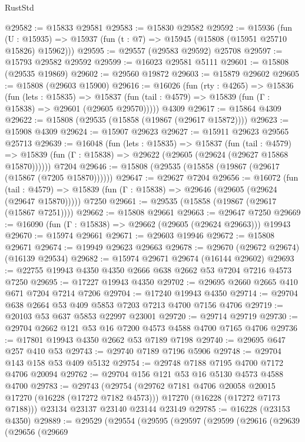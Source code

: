 \begin{lexlean}{RustStd}
\begin{coremodule}
@29582 := @15833 @29581
@29583 := @15830 @29582
@29592 := @15936
    (fun (U : @15935) => @15937 (fun (t : @7) => @15945 (@15808 (@15951 @25710 @15826) @15962)))
@29595 := @29557 (@29583 @29592) @25708
@29597 := @15793 @29582 @29592
@29599 := @16023 @29581 @5111
@29601 := @15808 (@29535 @19869)
@29602 := @29560 @19872
@29603 := @15879 @29602
@29605 := @15808 (@29603 @15900)
@29616 := @16026
    (fun (rty : @4265) =>
    @15836
      (fun (lets : @15835) =>
      @15837 (fun (tail : @4579) => @15839 (fun (Γ : @15838) => @29601 (@29605 @29570)))))
    @4309
@29617 := @15864 @4309
@29622 := @15808 (@29535 (@15858 (@19867 (@29617 @15872))))
@29623 := @15908 @4309
@29624 := @15907 @29623
@29627 := @15911 @29623 @29565 @25713
@29639 := @16048
    (fun (lets : @15835) =>
    @15837
      (fun (tail : @4579) =>
      @15839 (fun (Γ : @15838) => @29622 (@29605 (@29624 (@29627 @15868 @15870))))))
    @7204
@29646 := @15808 (@29535 (@15858 (@19867 (@29617 (@15867 (@7205 @15870))))))
@29647 := @29627 @7204
@29656 := @16072
    (fun (tail : @4579) => @15839 (fun (Γ : @15838) => @29646 (@29605 (@29624 (@29647 @15870)))))
    @7250
@29661 := @29535 (@15858 (@19867 (@29617 (@15867 @7251))))
@29662 := @15808 @29661
@29663 := @29647 @7250
@29669 := @16090 (fun (Γ : @15838) => @29662 (@29605 (@29624 @29663))) @19943
@29670 := @15974 @29661
@29671 := @29603 @19946
@29672 := @15808 @29671
@29674 := @19949 @29623 @29663
@29678 := @29670 (@29672 @29674) (@16139 @29534)
@29682 := @15974 @29671 @29674 (@16144 @29602)
@29693 := @22755 @19943 @4350 @4350 @2666 @638 @2662 @53 @7204 @7216 @4573 @7250
@29695 := @17227 @19943 @4350
@29702 := @29695 @2660 @2665 @410 @671 @7204 @7214 @7206
@29704 := @17240 @19943 @4350
@29714 := @29704 @638 @2664 @53 @409 @5853 @7203 @7213 @4700 @7156 @4706
@29719 := @20103 @53 @637 @5853 @22997 @23001
@29720 := @29714 @29719
@29730 := @29704 @2662 @121 @53 @16 @7200 @4573 @4588 @4700 @7165 @4706
@29736 := @17801 @19943 @4350 @2662 @53 @7189 @7198
@29740 := @29695 @647 @257 @410 @53
@29743 := @29740 @7189 @7196 @5906
@29748 := @29704 @143 @158 @53 @409 @5132
@29754 := @29748 @7188 @7195 @4700 @7172 @4706 @20094
@29762 := @29704 @156 @121 @53 @16 @5130 @4573 @4588 @4700
@29783 := @29743
    (@29754
      (@29762 @7181 @4706 @20058 @20015 @17270 (@16228 (@17272 @7182 @4573)))
      @17270
      (@16228 (@17272 @7173 @7188)))
    @23134
    @23137
    @23140
    @23144
    @23149
@29785 := @16228 (@23153 @4350)
@29889 := @29529
    (@29554
      (@29595
        (@29597
          (@29599
            (@29616
              (@29639
                (@29656
                  (@29669

\end{coremodule}
\end{lexlean}
